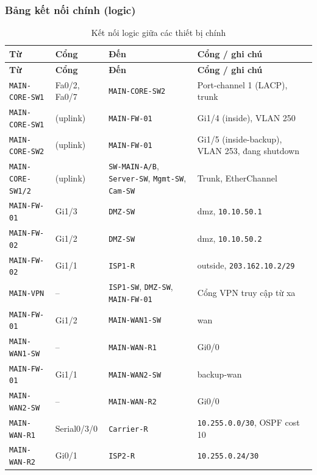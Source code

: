 \subsubsection{Bảng kết nối chính (logic)}
\begin{small}
\setlength{\tabcolsep}{4pt}
\begin{longtable}{|p{3.0cm}|p{2.2cm}|p{3.6cm}|p{4.8cm}|}
\caption{Kết nối logic giữa các thiết bị chính} \label{tab:cabling} \\
\hline
\textbf{Từ} & \textbf{Cổng} & \textbf{Đến} & \textbf{Cổng / ghi chú} \\ \hline
\endfirsthead
\hline \textbf{Từ} & \textbf{Cổng} & \textbf{Đến} & \textbf{Cổng / ghi chú} \\ \hline
\endhead
\texttt{MAIN-CORE-SW1} & Fa0/2, Fa0/7 & \texttt{MAIN-CORE-SW2} & Port-channel 1 (LACP), trunk \\ \hline
\texttt{MAIN-CORE-SW1} & (uplink) & \texttt{MAIN-FW-01} & Gi1/4 (inside), VLAN 250 \\ \hline
\texttt{MAIN-CORE-SW2} & (uplink) & \texttt{MAIN-FW-01} & Gi1/5 (inside-backup), VLAN 253, đang shutdown \\ \hline
\texttt{MAIN-CORE-SW1/2} & (uplink) & \texttt{SW-MAIN-A/B}, \texttt{Server-SW}, \texttt{Mgmt-SW}, \texttt{Cam-SW} & Trunk, EtherChannel \\ \hline
\texttt{MAIN-FW-01} & Gi1/3 & \texttt{DMZ-SW} & dmz, \texttt{10.10.50.1} \\ \hline
\texttt{MAIN-FW-02} & Gi1/2 & \texttt{DMZ-SW} & dmz, \texttt{10.10.50.2} \\ \hline
\texttt{MAIN-FW-02} & Gi1/1 & \texttt{ISP1-R} & outside, \texttt{203.162.10.2/29} \\ \hline
\texttt{MAIN-VPN} & -- & \texttt{ISP1-SW}, \texttt{DMZ-SW}, \texttt{MAIN-FW-01} & Cổng VPN truy cập từ xa \\ \hline
\texttt{MAIN-FW-01} & Gi1/2 & \texttt{MAIN-WAN1-SW} & wan \\ \hline
\texttt{MAIN-WAN1-SW} & -- & \texttt{MAIN-WAN-R1} & Gi0/0 \\ \hline
\texttt{MAIN-FW-01} & Gi1/1 & \texttt{MAIN-WAN2-SW} & backup-wan \\ \hline
\texttt{MAIN-WAN2-SW} & -- & \texttt{MAIN-WAN-R2} & Gi0/0 \\ \hline
\texttt{MAIN-WAN-R1} & Serial0/3/0 & \texttt{Carrier-R} & \texttt{10.255.0.0/30}, OSPF cost 10 \\ \hline
\texttt{MAIN-WAN-R2} & Gi0/1 & \texttt{ISP2-R} & \texttt{10.255.0.24/30} \\ \hline

\end{longtable}
\end{small}
